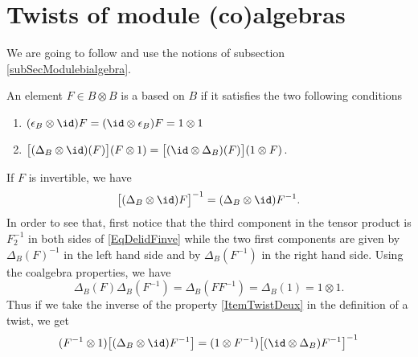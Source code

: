 \section{Twists of module (co)algebras}
\label{SecTheoryTwist}

We are going to follow \cite{GiaquintoZhangTwist} and use the notions of subsection \ref{subSecModulebialgebra}. 
\begin{definition}	\label{DefTwist}
	An element $F\in B\otimes B$ is a  based on $B$ if it satisfies the two following conditions
	\begin{enumerate}

		\item\label{ItemTwistUn}
			$(\epsilon_B\otimes \id)F=(\id\otimes \epsilon_B)F=1\otimes 1$
		\item\label{ItemTwistDeux}
			$\big[ (\Delta_B\otimes\id)(F) \big](F\otimes 1)=\big[ (\id\otimes\Delta_B)(F) \big](1\otimes F)$.
	
	\end{enumerate}
\end{definition}
If $F$ is invertible, we have
\begin{equation}		\label{EqDelidFinve}
	\big[ (\Delta_B\otimes\id)F\big]^{-1}=(\Delta_B\otimes\id)F^{-1}.
\end{equation}
In order to see that, first notice that the third component in the tensor product is $F_2^{-1}$ in both sides of \eqref{EqDelidFinve} while the two first components are given by $\Delta_B(F)^{-1}$ in the left hand side and by $\Delta_B(F^{-1})$ in the right hand side. Using the coalgebra properties, we have
\begin{equation}
	\Delta_B(F)\Delta_B(F^{-1})=\Delta_B(FF^{-1})=\Delta_B(1)=1\otimes 1.
\end{equation}
Thus if we take the inverse of the property \ref{ItemTwistDeux} in the definition of a twist, we get
\begin{equation}		\label{EqFemuVaLeLem}
	(F^{-1}\otimes 1)\big[ (\Delta_B\otimes\id)F^{-1} \big]=(1\otimes F^{-1})\big[ (\id\otimes\Delta_B)F^{-1} \big]^{-1}
\end{equation}

